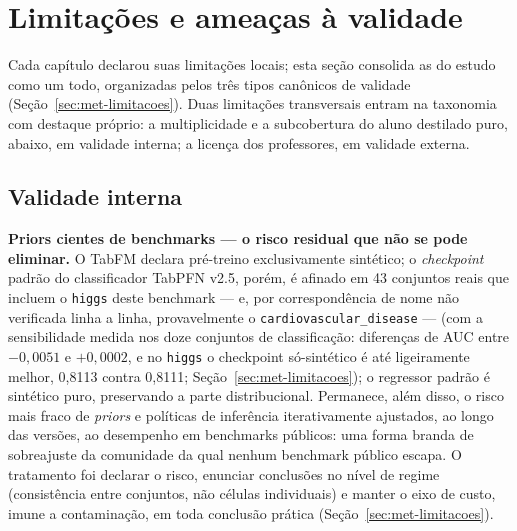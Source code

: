\section{Limitações e ameaças à validade}
\label{sec:conc-limitacoes}

Cada capítulo declarou suas limitações locais; esta seção consolida as
do estudo como um todo, organizadas pelos três tipos canônicos de
validade (Seção~\ref{sec:met-limitacoes}). Duas limitações
transversais entram na taxonomia com destaque próprio: a
multiplicidade e a subcobertura do aluno destilado puro, abaixo, em
validade interna; a licença dos professores, em validade externa.

\subsection{Validade interna}

\textbf{Priors cientes de benchmarks --- o risco residual que não
se pode eliminar.} O TabFM declara pré-treino exclusivamente sintético; o
\emph{checkpoint} padrão do classificador TabPFN v2.5, porém, é
afinado em 43 conjuntos reais que incluem o \texttt{higgs} deste
benchmark --- e, por correspondência de nome não verificada linha a
linha, provavelmente o \texttt{cardiovascular\_disease} --- (com a
sensibilidade medida nos doze conjuntos de classificação: diferenças
de AUC entre $-0{,}0051$ e $+0{,}0002$, e no \texttt{higgs} o
checkpoint só-sintético é até ligeiramente melhor, 0,8113 contra
0,8111; Seção~\ref{sec:met-limitacoes}); o regressor padrão é sintético puro,
preservando a parte distribucional. Permanece, além disso, o risco mais fraco de
\emph{priors} e políticas de inferência iterativamente ajustados, ao
longo das versões, ao desempenho em benchmarks públicos: uma forma
branda de sobreajuste da comunidade da qual nenhum benchmark público
escapa. O tratamento foi declarar o risco, enunciar conclusões no nível
de regime (consistência entre conjuntos, não células individuais) e
manter o eixo de custo, imune a contaminação, em toda conclusão
prática (Seção~\ref{sec:met-limitacoes}).

